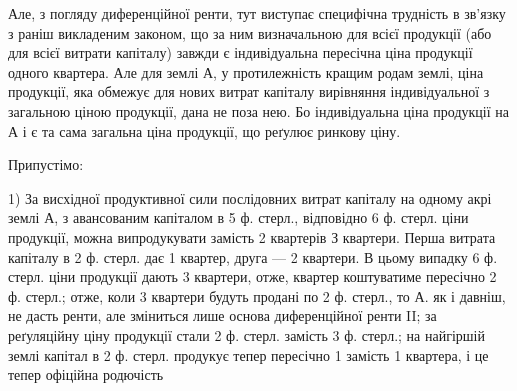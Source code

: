 Але, з погляду диференційної ренти, тут виступає специфічна трудність
в зв’язку з раніш викладеним законом, що за ним визначальною для всієї продукції
(або для всієї витрати капіталу) завжди є індивідуальна пересічна ціна
продукції одного квартера. Але для землі А, у протилежність кращим родам
землі, ціна продукції, яка обмежує для нових витрат капіталу вирівняння індивідуальної
з загальною ціною продукції, дана не поза нею. Бо індивідуальна ціна
продукції на А і є та сама загальна ціна продукції, що реґулює ринкову ціну.

Припустімо:

1) За висхідної продуктивної сили послідовних витрат
капіталу на одному акрі землі А, з авансованим капіталом в 5 ф. стерл.,
відповідно 6 ф. стерл. ціни продукції, можна випродукувати замість 2 квартерів
З квартери. Перша витрата капіталу в 2  ф. стерл. дає 1 квартер, друга — 2 квартери. В цьому
випадку 6 ф. стерл. ціни продукції дають 3 квартери,
отже, квартер коштуватиме пересічно 2 ф. стерл.; отже, коли 3 квартери
будуть продані по 2 ф. стерл., то А. як і давніш, не дасть ренти, але зміниться
лише основа диференційної ренти II; за реґуляційну ціну продукції стали
2 ф. стерл. замість 3 ф. стерл.; на найгіршій землі капітал в 2   ф. стерл.
продукує тепер пересічно 1   замість 1 квартера, і це тепер офіційна родючість
\parbreak{}  %
